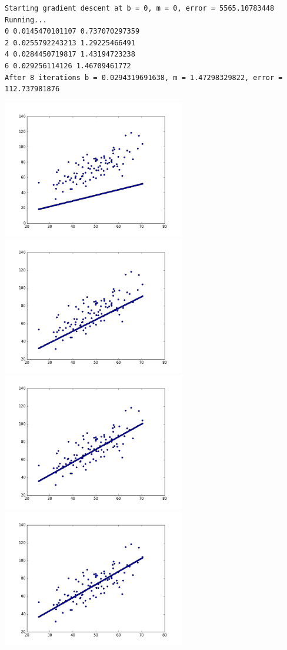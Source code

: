 \documentclass[12pt,fleqn]{article}\usepackage{../../common}
\begin{document}
\begin{verbatim}
Starting gradient descent at b = 0, m = 0, error = 5565.10783448
Running...
0 0.0145470101107 0.737070297359
2 0.0255792243213 1.29225466491
4 0.0284450719817 1.43194723238
6 0.029256114126 1.46709461772
After 8 iterations b = 0.0294319691638, m = 1.47298329822, error = 112.737981876
\end{verbatim}

\includegraphics[height=6cm]{grad_desc_0.png}
\includegraphics[height=6cm]{grad_desc_2.png}
\includegraphics[height=6cm]{grad_desc_4.png}
\includegraphics[height=6cm]{grad_desc_6.png}
\end{document}
